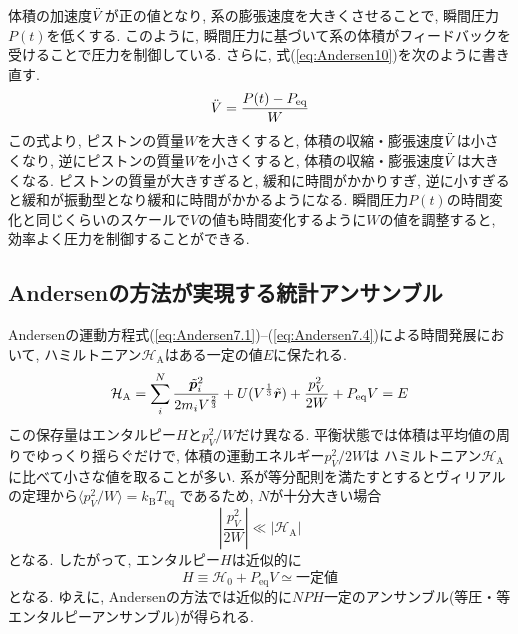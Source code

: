 体積の加速度$\Ddot{V}$が正の値となり, 系の膨張速度を大きくさせることで, 瞬間圧力$P(t)$を低くする. 
このように, 瞬間圧力に基づいて系の体積がフィードバックを受けることで圧力を制御している. 
さらに, 式(\ref{eq:Andersen10})を次のように書き直す. 
\begin{equation}
 \Ddot{V} = \frac{P(t) - P_{\mathrm{eq}}}{W}
\label{eq:Andersen11}
\end{equation}
この式より, ピストンの質量$W$を大きくすると, 体積の収縮・膨張速度$\Ddot{V}$は小さくなり, 
逆にピストンの質量$W$を小さくすると, 体積の収縮・膨張速度$\Ddot{V}$は大きくなる. 
ピストンの質量が大きすぎると, 緩和に時間がかかりすぎ, 
逆に小すぎると緩和が振動型となり緩和に時間がかかるようになる. 
瞬間圧力$P(t)$の時間変化と同じくらいのスケールで$V$の値も時間変化するように$W$の値を調整すると, 
効率よく圧力を制御することができる. 

\subsection{Andersenの方法が実現する統計アンサンブル}
Andersenの運動方程式(\ref{eq:Andersen7.1})--(\ref{eq:Andersen7.4})による時間発展において,
ハミルトニアン$\mathcal{H}_{\mathrm{A}}$はある一定の値$E$に保たれる. 
\begin{equation}
 \mathcal{H}_{\mathrm{A}}
  =
 \sum_{i}^{N} \frac{\Tilde{\bm{p}}_{i}^{2}}{2 m_{i} V^{\frac{2}{3}}}
 + U(V^{\frac{1}{3}} \Tilde{\bm{r}})
 + \frac{p_{V}^2}{2W} + P_{\mathrm{eq}}V
 =
 E
 \label{eq:Andersen12}
\end{equation}
この保存量はエンタルピー$H$と$p_{V}^{2}/W$だけ異なる.
平衡状態では体積は平均値の周りでゆっくり揺らぐだけで, 体積の運動エネルギー$p_{V}^{2}/2W$は
ハミルトニアン$\mathcal{H}_{\mathrm{A}}$に比べて小さな値を取ることが多い.
系が等分配則を満たすとするとヴィリアルの定理から$\langle p_{V}^{2}/W \rangle = k_{\mathrm{B}}T_{\mathrm{eq}}$
であるため, $N$が十分大きい場合
\begin{equation}
 \left| \frac{p_{V}^{2}}{2 W} \right| \ll \left| \mathcal{H}_{\mathrm{A}} \right|
 \label{eq:Andersen13}
\end{equation}
となる. したがって, エンタルピー$H$は近似的に
\begin{equation}
 H
  \equiv
  \mathcal{H}_{0} + P_{\mathrm{eq}} V
  \simeq
  \mathrm{一定値}
  \label{eq:Andersen14}
\end{equation}
となる. ゆえに, Andersenの方法では近似的に$NPH$一定のアンサンブル(等圧・等エンタルピーアンサンブル)が得られる. 
